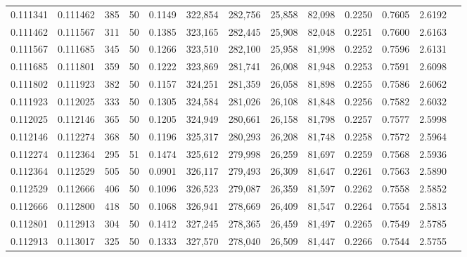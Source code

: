 \begin{tabular}{rrrrrrrrrrrrr}
0.111341 & 0.111462 &   385 &  50 &                                     0.1149 & 322,854 & 282,756 &  25,858 &  82,098 & 0.2250 & 0.7605 & 2.6192 \\
0.111462 & 0.111567 &   311 &  50 &                                     0.1385 & 323,165 & 282,445 &  25,908 &  82,048 & 0.2251 & 0.7600 & 2.6163 \\
0.111567 & 0.111685 &   345 &  50 &                                     0.1266 & 323,510 & 282,100 &  25,958 &  81,998 & 0.2252 & 0.7596 & 2.6131 \\
0.111685 & 0.111801 &   359 &  50 &                                     0.1222 & 323,869 & 281,741 &  26,008 &  81,948 & 0.2253 & 0.7591 & 2.6098 \\
0.111802 & 0.111923 &   382 &  50 &                                     0.1157 & 324,251 & 281,359 &  26,058 &  81,898 & 0.2255 & 0.7586 & 2.6062 \\
0.111923 & 0.112025 &   333 &  50 &                                     0.1305 & 324,584 & 281,026 &  26,108 &  81,848 & 0.2256 & 0.7582 & 2.6032 \\
0.112025 & 0.112146 &   365 &  50 &                                     0.1205 & 324,949 & 280,661 &  26,158 &  81,798 & 0.2257 & 0.7577 & 2.5998 \\
0.112146 & 0.112274 &   368 &  50 &                                     0.1196 & 325,317 & 280,293 &  26,208 &  81,748 & 0.2258 & 0.7572 & 2.5964 \\
0.112274 & 0.112364 &   295 &  51 &                                     0.1474 & 325,612 & 279,998 &  26,259 &  81,697 & 0.2259 & 0.7568 & 2.5936 \\
0.112364 & 0.112529 &   505 &  50 &                                     0.0901 & 326,117 & 279,493 &  26,309 &  81,647 & 0.2261 & 0.7563 & 2.5890 \\
0.112529 & 0.112666 &   406 &  50 &                                     0.1096 & 326,523 & 279,087 &  26,359 &  81,597 & 0.2262 & 0.7558 & 2.5852 \\
0.112666 & 0.112800 &   418 &  50 &                                     0.1068 & 326,941 & 278,669 &  26,409 &  81,547 & 0.2264 & 0.7554 & 2.5813 \\
0.112801 & 0.112913 &   304 &  50 &                                     0.1412 & 327,245 & 278,365 &  26,459 &  81,497 & 0.2265 & 0.7549 & 2.5785 \\
0.112913 & 0.113017 &   325 &  50 &                                     0.1333 & 327,570 & 278,040 &  26,509 &  81,447 & 0.2266 & 0.7544 & 2.5755 \\

\end{tabular}
